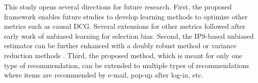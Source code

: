 \documentclass[manuscript,screen]{acmart}
\begin{document}
This study opens several directions for future research.
First, the proposed framework enables future studies to develop learning methods to optimize other metrics such as causal DCG.
Several extensions \cite{Hu19, Agarwal19} for other metrics followed after early work \cite{Joachims17} of unbiased learning for selection bias.
Second, the IPS-based unbiased estimator can be further enhanced with a doubly robust method \cite{Wang19} or variance reduction methods \cite{Swaminathan15a, Swaminathan15b}.
Third, the proposed method, which is meant for only one type of recommendation, can be extended to multiple types of recommendations where items are recommended by e-mail, pop-up after log-in, etc.


%
%
%
\end{document}
